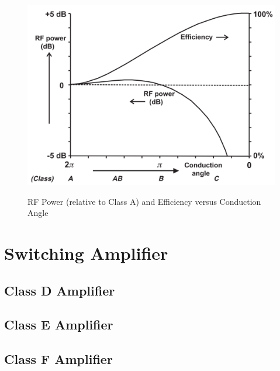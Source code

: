 \begin{figure}
  \centering
  \includegraphics[width=6in]{figures/classes/bias_power_eff}\\
  \caption{RF Power (relative to Class A) and Efficiency versus Conduction Angle \cite{C.Cripps2006}}\label{fig:bias_power_eff}
\end{figure}

\section{Switching Amplifier}

\subsection{Class D Amplifier}

\subsection{Class E Amplifier}



\subsection{Class F Amplifier}


